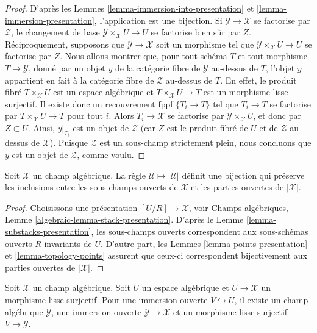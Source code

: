 \begin{proof}
D'après les Lemmes \ref{lemma-immersion-into-presentation} et
\ref{lemma-immersion-presentation},
l'application est une bijection.
Si $\mathcal{Y} \to \mathcal{X}$ se factorise par $\mathcal{Z}$,
le changement de base $\mathcal{Y} \times_\mathcal{X} U \to U$
se factorise bien sûr par $Z$. Réciproquement, supposons que $\mathcal{Y} \to \mathcal{X}$
soit un morphisme tel que $\mathcal{Y} \times_\mathcal{X} U \to U$
se factorise par $Z$. Nous allons montrer que, pour tout schéma $T$ et tout
morphisme $T \to \mathcal{Y}$,
donné par un objet $y$ de la catégorie fibre de $\mathcal{Y}$ au-dessus de $T$,
l'objet $y$ appartient en fait à la catégorie fibre de $\mathcal{Z}$ au-dessus de $T$.
En effet, le produit fibré $T \times_\mathcal{X} U$ est un espace
algébrique et $T \times_\mathcal{X} U \to T$ est un morphisme lisse surjectif.
Il existe donc un recouvrement fppf $\{T_i \to T\}$ tel que
$T_i \to T$ se factorise par $T \times_\mathcal{X} U \to T$ pour tout $i$.
Alors $T_i \to \mathcal{X}$ se factorise par $\mathcal{Y} \times_\mathcal{X} U$,
et donc par $Z \subset U$. Ainsi, $y|_{T_i}$ est un objet de
$\mathcal{Z}$ (car $Z$ est le produit fibré de $U$ et de
$\mathcal{Z}$ au-dessus de $\mathcal{X}$).
Puisque $\mathcal{Z}$ est un sous-champ strictement plein, nous concluons
que $y$ est un objet de $\mathcal{Z}$, comme voulu.
\end{proof}

\begin{lemma}
\label{lemma-open-substacks}
Soit $\mathcal{X}$ un champ algébrique. La règle
$\mathcal{U} \mapsto |\mathcal{U}|$ définit une bijection qui préserve les inclusions
entre les sous-champs ouverts de $\mathcal{X}$ et les parties ouvertes
de $|\mathcal{X}|$.
\end{lemma}

\begin{proof}
Choisissons une présentation $[U/R] \to \mathcal{X}$, voir
Champs algébriques, Lemme \ref{algebraic-lemma-stack-presentation}.
D'après le
Lemme \ref{lemma-substacks-presentation},
les sous-champs ouverts correspondent aux sous-schémas ouverts $R$-invariants
de $U$. D'autre part, les
Lemmes \ref{lemma-points-presentation} et \ref{lemma-topology-points}
assurent que ceux-ci correspondent bijectivement aux parties ouvertes de $|\mathcal{X}|$.
\end{proof}

\begin{lemma}
\label{lemma-open-image-substack}
Soit $\mathcal X$ un champ algébrique. Soit $U$ un espace algébrique et
$U \to \mathcal X$ un morphisme lisse surjectif. Pour une immersion ouverte
$V \hookrightarrow U$, il existe un champ algébrique $\mathcal Y$, une
immersion ouverte $\mathcal Y \to \mathcal X$ et un morphisme lisse
surjectif $V \to \mathcal Y$.
\end{lemma}

